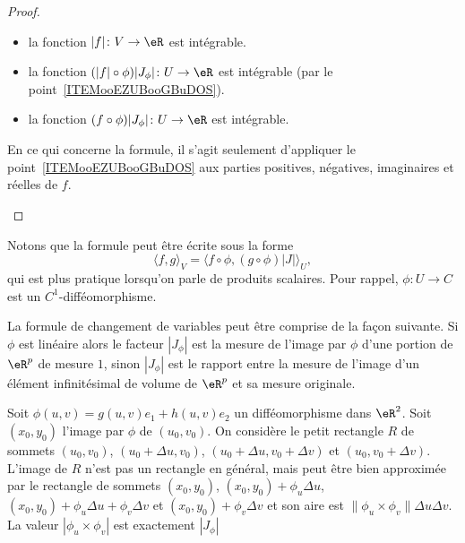 \begin{proof}
\begin{enumerate}
\begin{itemize}
			      \item la fonction \( | f |\colon V\to \eR\) est intégrable.
			      \item la fonction \( (| f |\circ\phi)| J_{\phi} |\colon U\to \eR\) est intégrable (par le point~\ref{ITEMooEZUBooGBuDOS}).
			      \item la fonction \( (f\circ\phi)| J_{\phi} |\colon U\to \eR\) est intégrable.
		      \end{itemize}
		      En ce qui concerne la formule, il s'agit seulement d'appliquer le point~\ref{ITEMooEZUBooGBuDOS} aux parties positives, négatives, imaginaires et réelles de \( f\).
	\end{enumerate}
\end{proof}

Notons que la formule peut être écrite sous la forme
\begin{equation}        \label{EQooQKARooELPCFO}
	\langle f, g\rangle_V=\langle f\circ\phi, (g\circ\phi)| J |\rangle_U,
\end{equation}
qui est plus pratique lorsqu'on parle de produits scalaires. Pour rappel, \( \phi\colon U\to C\) est un \( C^1\)-difféomorphisme.

\begin{normaltext}
	La formule de changement de variables peut être comprise de la façon suivante. Si \( \phi\) est linéaire  alors le facteur \( |J_{\phi}|\) est la mesure de l'image par \( \phi\) d'une portion de \( \eR^p\) de mesure \( 1\), sinon  \( |J_{\phi}|\) est le rapport entre la mesure de l'image d'un élément infinitésimal de volume de \( \eR^p\) et sa mesure originale.

	Soit \( \phi(u,v)=g(u,v)e_1+h(u,v)e_2\) un difféomorphisme dans \( \eR^2\). Soit \( (x_0, y_0)\) l'image par \( \phi\) de \( (u_0,v_0)\). On considère le petit rectangle \( R\) de sommets \( (u_0,v_0)\), \( (u_0+\Delta u,v_0)\), \( (u_0+\Delta u,v_0+\Delta v)\) et \( (u_0,v_0+\Delta v)\). L'image de \( R\) n'est pas un rectangle en général, mais peut être bien approximée par le rectangle de sommets \( (x_0,y_0)\), \( (x_0 ,y_0)+ \phi_{u}\Delta u\), \( (x_0 ,y_0)+\phi_{u}\Delta u +\phi_{v}\Delta v\) et  \( (x_0 ,y_0)+ \phi_{v}\Delta v\) et son aire est \( \| \phi_{u}\times \phi_{v}\| \Delta u\Delta v\). La valeur \( |\phi_{u}\times \phi_{v}|\) est exactement \( |J_{\phi}|\)
\end{normaltext}

